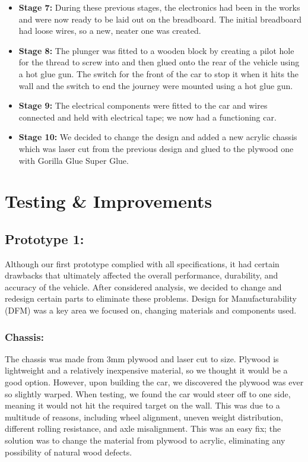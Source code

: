 \documentclass{article}
\begin{document}
\begin{itemize}
	\item \textbf{Stage 7:} During these previous stages, the electronics had been in the works and were now ready to be laid out on the breadboard. The initial breadboard had loose wires, so a new, neater one was created.
	
	\item \textbf{Stage 8:} The plunger was fitted to a wooden block by creating a pilot hole for the thread to screw into and then glued onto the rear of the vehicle using a hot glue gun. The switch for the front of the car to stop it when it hits the wall and the switch to end the journey were mounted using a hot glue gun.
	
	\item \textbf{Stage 9:} The electrical components were fitted to the car and wires connected and held with electrical tape; we now had a functioning car.
	
	\item \textbf{Stage 10:} We decided to change the design and added a new acrylic chassis which was laser cut from the previous design and glued to the plywood one with Gorilla Glue Super Glue.
\end{itemize}
\vspace*{0.2em}
\section{Testing \& Improvements}

\subsection{Prototype 1:}
Although our first prototype complied with all specifications, it had certain drawbacks that ultimately affected the overall performance, durability, and accuracy of the vehicle. After considered analysis, we decided to change and redesign certain parts to eliminate these problems. Design for Manufacturability (DFM) was a key area we focused on, changing materials and components used.

\subsubsection{Chassis:}
The chassis was made from 3mm plywood and laser cut to size. Plywood is lightweight and a relatively inexpensive material, so we thought it would be a good option. However, upon building the car, we discovered the plywood was ever so slightly warped. When testing, we found the car would steer off to one side, meaning it would not hit the required target on the wall. This was due to a multitude of reasons, including wheel alignment, uneven weight distribution, different rolling resistance, and axle misalignment. This was an easy fix; the solution was to change the material from plywood to acrylic, eliminating any possibility of natural wood defects.
\end{document}
